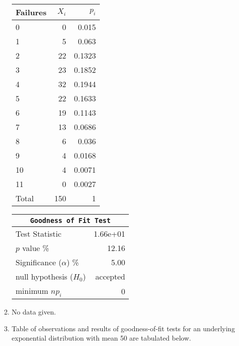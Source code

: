 \begin{enumerate}
	\begin{table}[H]
		\centering
		\begin{minipage}{0.4\textwidth}
			\centering
			\begin{tabular}{@{}lrr@{}}
				\toprule
				Failures  & $X_i$ &   $p_i$ \\
				\midrule
				0     &     0 &   0.015 \\
				1     &     5 &   0.063 \\
				2     &    22 &  0.1323 \\
				3     &    23 &  0.1852 \\
				4     &    32 &  0.1944 \\
				5     &    22 &  0.1633 \\
				6     &    19 &  0.1143 \\
				7     &    13 &  0.0686 \\
				8     &     6 &   0.036 \\
				9     &     4 &  0.0168 \\
				10    &     4 &  0.0071 \\
				11    &     0 &  0.0027 \\
				\midrule
				Total &   150 &       1 \\
				\bottomrule
			\end{tabular}
			
		\end{minipage}
		\begin{minipage}{0.4\textwidth}
			\centering
			\begin{tabular}{@{}lr@{}}
				\toprule
				\multicolumn{2}{c}{\texttt{Goodness of Fit Test}} \\
				\midrule
				Test Statistic             &  1.66e+01 \\
				$p$ value \%               &     12.16 \\
				Significance ($\alpha$) \% &      5.00 \\
				null hypothesis ($H_0$)    &  accepted \\
				minimum $n p_i$            &         0 \\
				\bottomrule
			\end{tabular}
			
		\end{minipage}
	\end{table}
	\bigskip
	
	\item No data given.\\
	
	\item Table of observations and results of goodness-of-fit tests for an underlying exponential distribution with mean 50 are tabulated below.\\
	

\end{enumerate}
